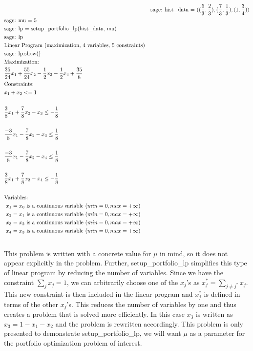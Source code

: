 \documentclass{article}
\begin{document}
\begin{align*}

&\text{}
&\text{sage: hist\_data = $((\frac{5}{3},\frac{2}{3}),(\frac{7}{3},\frac{1}{3}),(1,\frac{3}{4}))$}\\
&\text{sage: mu = 5}\\
&\text{sage: lp = setup\_portfolio\_lp(hist\_data, mu)}\\
&\text{sage: lp}\\
&\text{Linear Program (maximization, 4 variables, 5 constraints)}\\
&\text{sage: lp.show()}\\
&\text{Maximization:}\\
&\text{$\frac{35}{24} x_1 + \frac{55}{24} x_2 -\frac{1}{2} x_3 -\frac{1}{2} x_4 + \frac{35}{8}$}\\

&\text{Constraints:}\\
&\text{$  x_1 + x_2 <= 1$}\\
\\
&\text{$\frac{3}{8} x_1 + \frac{7}{8} x_2 - x_3 \leq -\frac{1}{8}$}\\
\\
&\text{$\frac{-3}{8} x_1 - \frac{7}{8} x_2 - x_3\leq \frac{1}{8}$}\\
\\
&\text{$\frac{-3}{8} x_1 - \frac{7}{8} x_2 - x_4 \leq \frac{1}{8}$}\\
\\
&\text{$\frac{3}{8} x_1 + \frac{7}{8} x_2 - x_4 \leq -\frac{1}{8}$}\\
\\
&\text{Variables:}\\
&\text{  $x_1 = x_0$ is a continuous variable $(min=0, max=+\infty)$}\\
&\text{  $x_2 = x_1$ is a continuous variable $(min=0, max=+\infty)$}\\
&\text{  $x_3 = x_2$ is a continuous variable $(min=0, max=+\infty)$}\\
&\text{  $x_4 = x_3$ is a continuous variable $(min=0, max=+\infty)$}\\
\end{align*}
\\

This problem is written with a concrete value for $\mu$ in mind, so it does not appear explicitly in the problem. Further, {\selectfont setup\_portfolio\_lp} simplifies this type of linear program by reducing the number of variables. Since we have the constraint $\sum_{j} x_j = 1$, we can arbitrarily choose one of the $x_j$'s as $x_j^* = \sum_{j\ne j^*} x_j$. This new constraint is then included in the linear program and $x_j^*$ is defined in terms of the other $x_j$'s. This reduces the number of variables by one and thus creates a problem that is solved more efficiently. In this case $x_3$ is written as $x_3 = 1-x_1-x_2$ and the problem is rewritten accordingly. This problem is only presented to demonstrate {\selectfont setup\_portfolio\_lp}, we will want $\mu$ as a parameter for the portfolio optimization problem of interest. 
\end{document}

